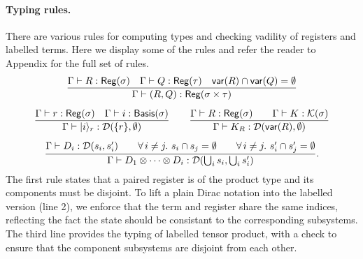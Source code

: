 \paragraph*{Typing rules.}
There are various rules for computing types and checking vadility of
registers and labelled terms. Here we display some of the rules and
refer the reader to Appendix for the full set of rules.
\begin{gather*}
  \frac{
      \Gamma \vdash R : \mathsf{Reg}(\sigma) \quad
      \Gamma \vdash Q : \mathsf{Reg}(\tau)
      \quad \mathsf{var}(R) \cap \mathsf{var}(Q) = \emptyset
  }{\Gamma \vdash (R,Q) : \mathsf{Reg}(\sigma \times \tau)} \\[0.2cm]
  \frac{
          \Gamma \vdash r : \mathsf{Reg}(\sigma) \quad
          \Gamma \vdash i : \mathsf{Basis}(\sigma)}
  {\Gamma \vdash |i\rangle_r : \mathcal{D}(\{r\}, \emptyset)}
  \qquad
  \frac{\Gamma \vdash R : \mathsf{Reg}(\sigma)\qquad \Gamma \vdash K : \mathcal{K}(\sigma)}{\Gamma \vdash K_R : \mathcal{D}(\mathsf{var}(R), \emptyset)} \\[0.2cm]
    \frac{
        \Gamma \vdash D_i : \mathcal{D}(s_i,s_i') \qquad
        \forall\,i\neq j.\ s_i\cap s_j = \emptyset \qquad
        \forall\,i\neq j.\ s'_i\cap s'_j = \emptyset
    }
    {\Gamma \vdash D_1 \otimes \cdots \otimes D_i : \mathcal{D}(\bigcup_i s_i, \bigcup_i s_i')}.
\end{gather*}
The first rule states that a paired register is of the product type and its components must be disjoint.
To lift a plain Dirac notation into the labelled version (line 2), we enforce that the term and register share the same indices, reflecting the fact the state should be consistant to the corresponding subsystems.
The third line provides the typing of labelled tensor product, with a check to ensure that the component subsystems are disjoint from each other.


